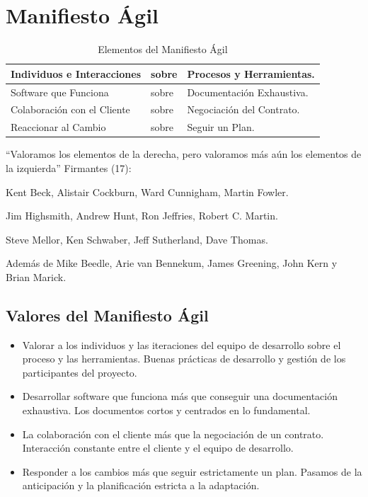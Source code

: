 \documentclass[12pt,twoside,titlepage]{report}
\begin{document}
{\chapter{Manifiesto Ágil}

\begin{table}[h]
    \begin{center}
        \begin{tabular}{| l | l | l |}
            \hline
            Individuos e Interacciones & sobre & Procesos y Herramientas. \\ \hline
            Software que Funciona & sobre & Documentación Exhaustiva. \\ \hline
            Colaboración con el Cliente & sobre & Negociación del Contrato. \\ \hline
            Reaccionar al Cambio & sobre & Seguir un Plan. \\ \hline
        \end{tabular}
        \caption{Elementos del Manifiesto Ágil}
        \label{tab:fruta}
    \end{center}
\end{table}

“Valoramos los elementos de la derecha, pero valoramos más aún los elementos de la izquierda”
Firmantes (17):

\begin{compactitem}
    \item Kent Beck, Alistair Cockburn, Ward Cunnigham, Martin Fowler.
    \item Jim Highsmith, Andrew Hunt, Ron Jeffries, Robert C. Martin.
    \item Steve Mellor, Ken Schwaber, Jeff Sutherland, Dave Thomas.
    \item Además de Mike Beedle, Arie van Bennekum, James Greening, John Kern y Brian Marick.
\end{compactitem}

\section{Valores del Manifiesto Ágil}
\begin{itemize}
    \item Valorar a los individuos y las iteraciones del equipo de desarrollo sobre el proceso y las herramientas. Buenas prácticas de desarrollo y gestión de los participantes del proyecto.
    \item Desarrollar software que funciona más que conseguir una documentación exhaustiva. Los documentos cortos y centrados en lo fundamental.
    \item La colaboración con el cliente más que la negociación de un contrato. Interacción constante entre el cliente y el equipo de desarrollo.
    \item Responder a los cambios más que seguir estrictamente un plan. Pasamos de la anticipación y la planificación estricta a la adaptación.
\end{itemize}

}
\end{document}
